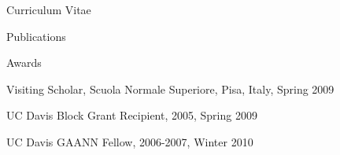 \documentclass[12pt]{amsart}
\begin{document}
\begin{cv}{Curriculum Vitae}
\begin{cvlist}{Publications}
\item
\item 
\item
\item
\item
\end{cvlist}

\begin{cvlist}{Awards}
\item Visiting Scholar, Scuola Normale Superiore, Pisa, Italy, Spring 2009
\item UC Davis Block Grant Recipient, 2005, Spring 2009
\item UC Davis GAANN Fellow, 2006-2007, Winter 2010 
\end{cvlist}
\end{cv}

 
\end{document}
